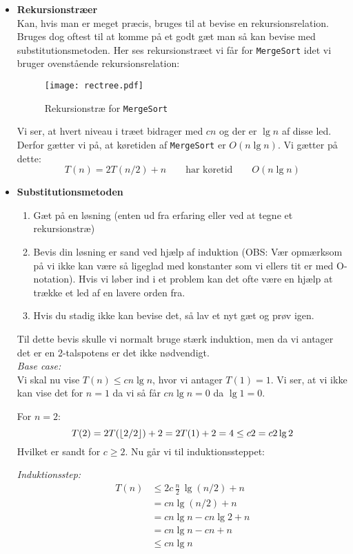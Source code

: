 \begin{itemize}
\item \textbf{Rekursionstræer}\\
Kan, hvis man er meget præcis, bruges til at bevise en rekursionsrelation. Bruges dog oftest til at komme på et godt gæt man så kan bevise med substitutionsmetoden. Her ses rekursionstræet vi får for \texttt{MergeSort} idet vi bruger ovenstående rekursionsrelation:
\begin{figure}[H]
	\begin{center}
		\texttt{[image: rectree.pdf]}
	\end{center}
	\caption{Rekursionstræ for \texttt{MergeSort}}
	\label{fig:tree}
\end{figure}

Vi ser, at hvert niveau i træet bidrager med $cn$ og der er $\lg n$ af disse led. Derfor gætter vi på, at køretiden af \texttt{MergeSort} er $O(n \lg n)$. Vi gætter på dette:
$$
T(n) = 2 T(n/2) + n \quad\quad \text{har køretid} \quad\quad O(n \lg n)
$$

\item \textbf{Substitutionsmetoden}
\begin{enumerate}
	\item Gæt på en løsning (enten ud fra erfaring eller ved at tegne et rekursionstræ)
	\item Bevis din løsning er sand ved hjælp af induktion (OBS: Vær opmærksom på vi ikke kan være så ligeglad med konstanter som vi ellers tit er med O-notation). Hvis vi løber ind i et problem kan det ofte være en hjælp at trække et led af en lavere orden fra.
	\item Hvis du stadig ikke kan bevise det, så lav et nyt gæt og prøv igen.
\end{enumerate}

Til dette bevis skulle vi normalt bruge stærk induktion, men da vi antager det er en 2-talspotens er det ikke nødvendigt.\\

\textit{Base case:}\\
Vi skal nu vise $T(n) \leq cn \lg n$, hvor vi antager $T(1) = 1$. Vi ser, at vi ikke kan vise det for $n = 1$ da vi så får $cn \lg n = 0$ da $\lg 1 = 0$.

For $n = 2$:
$$
T(2) = 2T(\left\lfloor 2/2 \right\rfloor) + 2 = 2T(1) + 2 = 4 \leq c 2 = c 2 \lg 2
$$
Hvilket er sandt for $c \geq 2$. Nu går vi til induktionssteppet:

\textit{Induktionsstep:}
\begin{align}
T(n) &\leq 2 c \, \frac{n}{2} \, \lg(n/2) + n \label{eq:ind-antagelse} \\
     &= cn \lg(n/2) + n \label{eq:fjern-broek} \\
     &= cn \lg n - cn \lg 2 + n \label{eq:del-lg-op} \\
     &= cn \lg n - cn + n \label{eq:fjern-lg} \\
     &\leq cn \lg n \label{eq:endelig}
\end{align}


\end{itemize}
